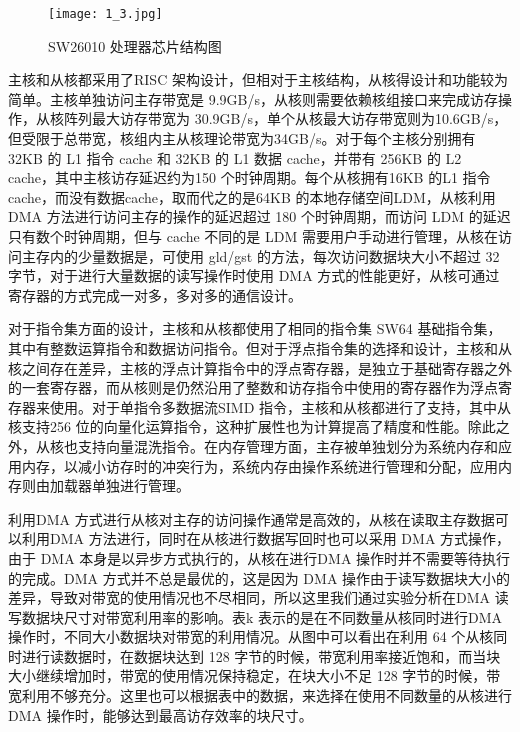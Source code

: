 \begin{figure}[h]
  \centering
  \texttt{[image: 1\_3.jpg]}
  \caption{SW26010 处理器芯片结构图}
\end{figure}

主核和从核都采用了RISC 架构设计，但相对于主核结构，从核得设计和功能较为简单。主核单独访问主存带宽是 9.9GB/s，从核则需要依赖核组接口来完成访存操作，从核阵列最大访存带宽为 30.9GB/s，单个从核最大访存带宽则为10.6GB/s，但受限于总带宽，核组内主从核理论带宽为34GB/s。对于每个主核分别拥有 32KB 的 L1 指令 cache 和 32KB 的 L1 数据 cache，并带有 256KB 的 L2 cache，其中主核访存延迟约为150 个时钟周期。每个从核拥有16KB 的L1 指令cache，而没有数据cache，取而代之的是64KB 的本地存储空间LDM，从核利用DMA 方法进行访问主存的操作的延迟超过 180 个时钟周期，而访问 LDM 的延迟只有数个时钟周期，但与 cache 不同的是 LDM 需要用户手动进行管理，从核在访问主存内的少量数据是，可使用 gld/gst 的方法，每次访问数据块大小不超过 32 字节，对于进行大量数据的读写操作时使用 DMA 方式的性能更好，从核可通过寄存器的方式完成一对多，多对多的通信设计。

对于指令集方面的设计，主核和从核都使用了相同的指令集 SW64 基础指令集，其中有整数运算指令和数据访问指令。但对于浮点指令集的选择和设计，主核和从核之间存在差异，主核的浮点计算指令中的浮点寄存器，是独立于基础寄存器之外的一套寄存器，而从核则是仍然沿用了整数和访存指令中使用的寄存器作为浮点寄存器来使用。对于单指令多数据流SIMD 指令，主核和从核都进行了支持，其中从核支持256 位的向量化运算指令，这种扩展性也为计算提高了精度和性能。除此之外，从核也支持向量混洗指令。在内存管理方面，主存被单独划分为系统内存和应用内存，以减小访存时的冲突行为，系统内存由操作系统进行管理和分配，应用内存则由加载器单独进行管理。

利用DMA 方式进行从核对主存的访问操作通常是高效的，从核在读取主存数据可以利用DMA 方法进行，同时在从核进行数据写回时也可以采用 DMA 方式操作，由于 DMA 本身是以异步方式执行的，从核在进行DMA 操作时并不需要等待执行的完成。DMA 方式并不总是最优的，这是因为 DMA 操作由于读写数据块大小的差异，导致对带宽的使用情况也不尽相同，所以这里我们通过实验分析在DMA 读写数据块尺寸对带宽利用率的影响。表k 表示的是在不同数量从核同时进行DMA 操作时，不同大小数据块对带宽的利用情况。从图中可以看出在利用 64 个从核同时进行读数据时，在数据块达到 128 字节的时候，带宽利用率接近饱和，而当块大小继续增加时，带宽的使用情况保持稳定，在块大小不足 128 字节的时候，带宽利用不够充分。这里也可以根据表中的数据，来选择在使用不同数量的从核进行 DMA 操作时，能够达到最高访存效率的块尺寸。

